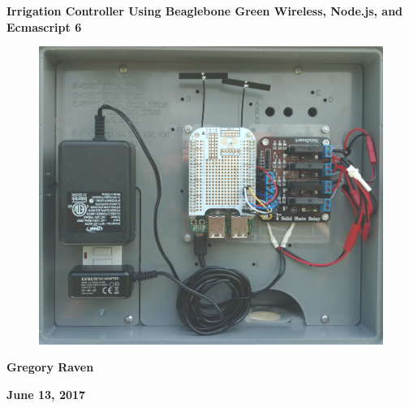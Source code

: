%
%
%

\thispagestyle{empty}
{\centering\bfseries\color{black}\Huge
Irrigation Controller Using Beaglebone Green Wireless, Node.js, and Ecmascript 6
\par}

\bigskip

\begin{figure}
	\centering
	\includegraphics[width=\textwidth]{photos/cover_photo}
\end{figure}

\bigskip
{\centering\bfseries\Large
Gregory Raven
\par}


\bigskip
{\centering\bfseries\LARGE
June 13, 2017
\par}



